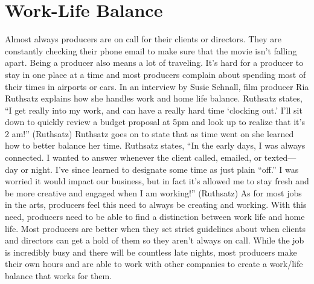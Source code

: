 \section{Work-Life Balance}
	Almost always producers are on call for their clients or directors. They are constantly checking their phone email to make sure that the movie isn’t falling apart. Being a producer also means a lot of traveling. It’s hard for a producer to stay in one place at a time and most producers complain about spending most of their times in airports or cars. In an interview by Susie Schnall,  film producer Ria Ruthsatz explains how she handles work and home life balance. Ruthsatz states, “I get really into my work, and can have a really hard time ‘clocking out.’ I’ll sit down to quickly review a budget proposal at 5pm and look up to realize that it’s 2 am!” (Ruthsatz) Ruthsatz goes on to state that as time went on she learned how to better balance her time. Ruthsatz states, “In the early days, I was always connected. I wanted to answer whenever the client called, emailed, or texted—day or night. I’ve since learned to designate some time as just plain “off.” I was worried it would impact our business, but in fact it’s allowed me to stay fresh and be more creative and engaged when I am working!” (Ruthsatz) As for most jobs in the arts, producers feel this need to always be creating and working. With this need, producers need to be able to find a distinction between work life and home life. Most producers are better when they set strict guidelines about when clients and directors can get a hold of them so they aren’t always on call. While the job is incredibly busy and there will be countless late nights, most producers make their own hours and are able to work with other companies to create a work/life balance that works for them.
